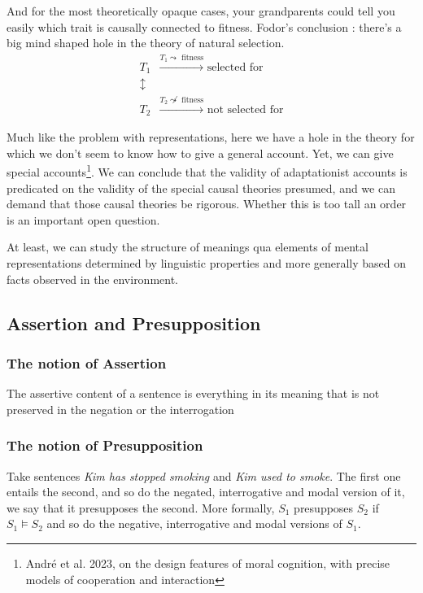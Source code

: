 \documentclass{cours}
\begin{document}
And for the most theoretically opaque cases, your grandparents could tell you easily which trait is causally connected to fitness. Fodor's conclusion\! : there's a big mind shaped hole in the theory of natural selection.
\[
    \begin{aligned}
        T_{1} & \xrightarrow{T_{1} \leadsto \text{ fitness}} \text{ selected for}\\
        \updownarrow & \\
        T_{2} & \xrightarrow{T_{2} \not\leadsto \text{ fitness}} \text{ not selected for}
    \end{aligned}    
\]

Much like the problem with representations, here we have a hole in the theory for which we don't seem to know how to give a general account. Yet, we can give special accounts\footnote{André et al. 2023, on the design features of moral cognition, with precise models of cooperation and interaction}. We can conclude that the validity of adaptationist accounts is predicated on the validity of the special causal theories presumed, and we can demand that those causal theories be rigorous. Whether this is too tall an order is an important open question. 

At least, we can study the structure of meanings qua elements of mental representations determined by linguistic properties and more generally based on facts observed in the environment.

\subsection{Assertion and Presupposition}
\subsubsection{The notion of Assertion}
The assertive content of a sentence is everything in its meaning that is not preserved in the negation or the interrogation

\subsubsection{The notion of Presupposition}
Take sentences \textsl{Kim has stopped smoking} and \textsl{Kim used to smoke}. The first one entails the second, and so do the negated, interrogative and modal version of it, we say that it presupposes the second.
More formally, $S_{1}$ presupposes $S_{2}$ if $S_{1} \vDash S_{2}$ and so do the negative, interrogative and modal versions of $S_{1}$.
\end{document}

